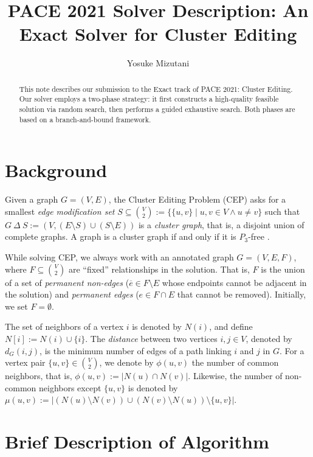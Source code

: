 \documentclass[a4paper,UKenglish,cleveref, autoref, thm-restate]{lipics-v2021}
\title{PACE 2021 Solver Description: An Exact Solver for Cluster Editing} %
\author{Yosuke Mizutani}{School of Computing, University of Utah, USA}{yos@cs.utah.edu}{}{}%
\begin{document}
\maketitle

\begin{abstract}
This note describes our submission to the Exact track of PACE 2021: Cluster Editing. Our solver employs a two-phase strategy: it first constructs a high-quality feasible solution via  random search, then performs a guided exhaustive search. Both phases are based on a branch-and-bound framework.
\end{abstract}

\section{Background}
\label{sec:typesetting-summary}

Given a graph $G=(V,E)$, the Cluster Editing Problem (CEP) asks for a smallest \textit{edge modification set} $S \subseteq \binom{V}{2} := \{\{u,v\} \mid u,v \in V \wedge u \neq v\}$ such that $G \ \Delta\ S := (V,(E \setminus S) \cup (S \setminus E))$ is a \textit{cluster graph}, that is, a disjoint union of complete graphs. A graph is a cluster graph if and only if it is $P_3$-free \cite{shamir2004cluster}.

While solving CEP, we always work with an annotated graph $G=(V,E,F)$, where $F \subseteq \binom{V}{2}$ are ``fixed'' relationships in the solution. That is, $F$ is the union of a set of \textit{permanent non-edges} ($\overline{e} \in F \setminus E$ whose endpoints cannot be adjacent in the solution) and \textit{permanent edges} ($e \in F \cap E$ that cannot be removed). Initially, we set $F=\emptyset$.

The set of neighbors of a vertex $i$ is denoted by $N(i)$, and define $N[i] := N(i) \cup \{i\}$. The \textit{distance} between two vertices $i,j\in V$, denoted by $d_G(i,j)$, is the minimum number of edges of a path linking $i$ and $j$ in $G$. For a vertex pair $\{u,v\} \in \binom{V}{2}$, we denote by $\phi(u,v)$ the number of common neighbors, that is, $\phi(u,v):=|N(u)\cap N(v)|$. Likewise, the number of non-common neighbors except $\{u,v\}$ is denoted by $\mu(u,v):=|(N(u)\setminus N(v)) \cup (N(v)\setminus N(u))\setminus \{u,v\}|$.

\section{Brief Description of Algorithm}
\end{document}
